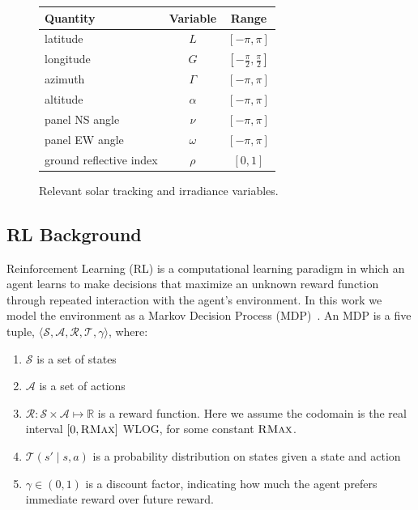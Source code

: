 \documentclass{article}
\newcommand{\mc}{\mathcal}
\begin{document}
{\renewcommand{\arraystretch}{1.2}%
\begin{figure}
\centering
\begin{tabular}{lcc}
\toprule
Quantity& Variable& Range \\
\midrule
latitude& $L$& $[-\pi, \pi]$ \\
longitude& $G$&  $\left[-\frac{\pi}{2}, \frac{\pi}{2}\right]$\\
azimuth& $\Gamma$& $[-\pi, \pi]$ \\
altitude& $\alpha$& $[-\pi, \pi]$ \\
panel NS angle& $\nu$& $[-\pi, \pi]$ \\
panel EW angle& $\omega$& $[-\pi, \pi]$ \\
ground reflective index& $\rho$& $[0,1]$ \\
\bottomrule
\end{tabular}
\caption{Relevant solar tracking and irradiance variables.}
\end{figure}

\subsection{RL Background}

Reinforcement Learning (RL) is a computational learning paradigm in which an agent learns to make decisions that maximize an unknown reward function through repeated interaction with the agent's environment. In this work we model the environment as a Markov Decision Process (MDP)~\cite{puterman2014markov}. An MDP is a five tuple, $\langle \mc{S}, \mc{A}, \mc{R}, \mc{T}, \gamma \rangle$, where:
\begin{enumerate}
\item $\mc{S}$ is a set of states
\item $\mc{A}$ is a set of actions
\item $\mc{R} : \mc{S} \times \mc{A} \longmapsto \mathbb{R}$ is a reward function. Here we assume the codomain is the real interval $[0,\textsc{RMax}] $ WLOG, for some constant $\textsc{RMax}$.
\item $\mc{T}(s' \mid s,a)$ is a probability distribution on states given a state and action
\item $\gamma \in (0,1)$ is a discount factor, indicating how much the agent prefers immediate reward over future reward.
\end{enumerate}

}
\end{document}
